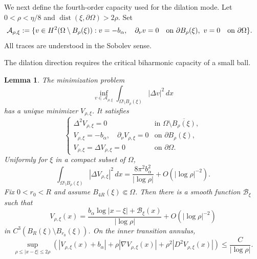\documentclass[11pt]{article}
\newtheorem{lemma}[theorem]{Lemma}
\numberwithin{equation}{section}
\begin{document}
We next define the fourth-order capacity used for the dilation
mode. Let $0<\rho<\eta/8$ and
$\operatorname{dist}(\xi,\partial\Omega)>2\rho$. Set
\begin{equation*}
\begin{aligned}
\mathcal A_{\rho,\xi}:=
\{v\in H^2(\Omega\setminus B_\rho(\xi)):\;&
v=-b_\alpha,\quad \partial_\nu v=0
\quad\hbox{on }\partial B_\rho(\xi),\ v=0\quad\hbox{on }\partial\Omega\}.
\end{aligned}
\end{equation*}
All traces are understood in the Sobolev sense.

The dilation direction requires the critical biharmonic capacity of a small ball.

\begin{lemma}\label{lem:biharmonic-capacity}
The minimization problem
\begin{equation}\label{eq:capacity-minimization}
\inf_{v\in\mathcal A_{\rho,\xi}}
\int_{\Omega\setminus B_\rho(\xi)}|\Delta v|^2\,dx
\end{equation}
has a unique minimizer $V_{\rho,\xi}$. It satisfies
\begin{equation}\label{eq:capacity-Euler}
\begin{cases}
\Delta^2V_{\rho,\xi}=0
&\text{in }\Omega\setminus\overline{B_\rho(\xi)},\\
V_{\rho,\xi}=-b_\alpha,\quad
\partial_\nu V_{\rho,\xi}=0
&\text{on }\partial B_\rho(\xi),\\
V_{\rho,\xi}=\Delta V_{\rho,\xi}=0
&\text{on }\partial\Omega.
\end{cases}
\end{equation}
Uniformly for $\xi$ in a compact subset of $\Omega$,
\begin{equation}\label{eq:capacity-asymptotic}
\int_{\Omega\setminus B_\rho(\xi)}
|\Delta V_{\rho,\xi}|^2\,dx
=\frac{8\pi^2b_\alpha^2}{|\log\rho|}
+O(|\log\rho|^{-2}).
\end{equation}
Fix $0<r_0<R$ and assume $B_{4R}(\xi)\Subset\Omega$. Then
there is a smooth function $\mathcal B_\xi$ such that
\begin{equation}\label{eq:capacity-profile-fixed}
V_{\rho,\xi}(x)
=\frac{b_\alpha\log|x-\xi|+\mathcal B_\xi(x)}
{|\log\rho|}
+O(|\log\rho|^{-2})
\end{equation}
in $C^3(B_R(\xi)\setminus B_{r_0}(\xi))$. On the inner transition
annulus,
\begin{equation}\label{eq:capacity-boundary-layer}
\sup_{\rho\leq|x-\xi|\leq2\rho}
\left(
|V_{\rho,\xi}(x)+b_\alpha|
+\rho|\nabla V_{\rho,\xi}(x)|
+\rho^2|D^2V_{\rho,\xi}(x)|
\right)
\leq\frac{C}{|\log\rho|}.
\end{equation}
\end{lemma}
\end{document}
